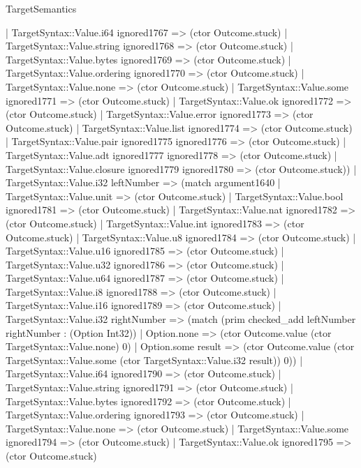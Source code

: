 \begin{lexlean}{TargetSemantics}
\begin{semanticmodule}
{              | TargetSyntax::Value.i64 ignored1767 => (ctor Outcome.stuck)
              | TargetSyntax::Value.string ignored1768 => (ctor Outcome.stuck)
              | TargetSyntax::Value.bytes ignored1769 => (ctor Outcome.stuck)
              | TargetSyntax::Value.ordering ignored1770 => (ctor Outcome.stuck)
              | TargetSyntax::Value.none => (ctor Outcome.stuck)
              | TargetSyntax::Value.some ignored1771 => (ctor Outcome.stuck)
              | TargetSyntax::Value.ok ignored1772 => (ctor Outcome.stuck)
              | TargetSyntax::Value.error ignored1773 => (ctor Outcome.stuck)
              | TargetSyntax::Value.list ignored1774 => (ctor Outcome.stuck)
              | TargetSyntax::Value.pair ignored1775 ignored1776 => (ctor Outcome.stuck)
              | TargetSyntax::Value.adt ignored1777 ignored1778 => (ctor Outcome.stuck)
              | TargetSyntax::Value.closure ignored1779 ignored1780 => (ctor Outcome.stuck))
            | TargetSyntax::Value.i32 leftNumber => (match argument1640
              | TargetSyntax::Value.unit => (ctor Outcome.stuck)
              | TargetSyntax::Value.bool ignored1781 => (ctor Outcome.stuck)
              | TargetSyntax::Value.nat ignored1782 => (ctor Outcome.stuck)
              | TargetSyntax::Value.int ignored1783 => (ctor Outcome.stuck)
              | TargetSyntax::Value.u8 ignored1784 => (ctor Outcome.stuck)
              | TargetSyntax::Value.u16 ignored1785 => (ctor Outcome.stuck)
              | TargetSyntax::Value.u32 ignored1786 => (ctor Outcome.stuck)
              | TargetSyntax::Value.u64 ignored1787 => (ctor Outcome.stuck)
              | TargetSyntax::Value.i8 ignored1788 => (ctor Outcome.stuck)
              | TargetSyntax::Value.i16 ignored1789 => (ctor Outcome.stuck)
              | TargetSyntax::Value.i32 rightNumber => (match (prim checked_add leftNumber rightNumber : (Option Int32))
                | Option.none => (ctor Outcome.value (ctor TargetSyntax::Value.none) 0)
                | Option.some result => (ctor Outcome.value (ctor TargetSyntax::Value.some (ctor TargetSyntax::Value.i32 result)) 0))
              | TargetSyntax::Value.i64 ignored1790 => (ctor Outcome.stuck)
              | TargetSyntax::Value.string ignored1791 => (ctor Outcome.stuck)
              | TargetSyntax::Value.bytes ignored1792 => (ctor Outcome.stuck)
              | TargetSyntax::Value.ordering ignored1793 => (ctor Outcome.stuck)
              | TargetSyntax::Value.none => (ctor Outcome.stuck)
              | TargetSyntax::Value.some ignored1794 => (ctor Outcome.stuck)
              | TargetSyntax::Value.ok ignored1795 => (ctor Outcome.stuck)
}
\end{semanticmodule}
\end{lexlean}
